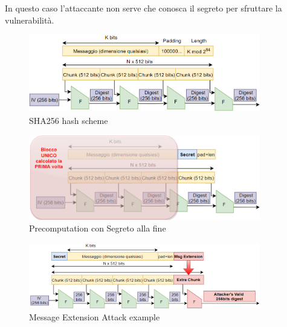 \begin{remark}
    In questo caso l'attaccante non serve che conosca il segreto per sfruttare la vulnerabilità.
\end{remark}
\begin{figure}[H]
    \centering
    \includegraphics[width=0.9\textwidth]{image/sha256.png}
    \caption{SHA256 hash scheme}
    \label{fig:sha256}
\end{figure}
\begin{figure}[h]
    \centering
    \includegraphics[width=0.9\textwidth]{image/stateprecomp.png}
    \caption{Precomputation con Segreto alla fine}
    \label{fig:secretprecomp}
\end{figure}
\begin{figure}[ht]
    \centering
    \includegraphics[width=0.9\textwidth]{image/macmsgext.png}
    \caption{Message Extension Attack example}
    \label{fig:macmsgext}
\end{figure}
